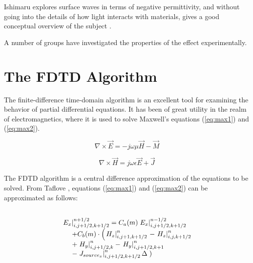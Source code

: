 \documentclass[11pt, conference, draftcls, letterpaper]{IEEEtran}
\begin{document}
Ishimaru explores surface waves in terms of negative permittivity,
and without going into the details of how light interacts with
materials, gives a good conceptual overview of the subject
\cite{ishimaru91}.  

A number of groups have investigated the properties of the effect
experimentally. 


\section{The FDTD Algorithm} 
The finite-difference time-domain algorithm \cite{yee1966} is an
excellent tool for examining the behavior of partial differential
equations. It has been of great utility in the realm of
electromagnetics, where it is used to solve Maxwell's equations
(\ref{eq:max1}) and (\ref{eq:max2}). 

\begin{equation}
  \label{eq:max1}
  \nabla \times \vec{E} = -j \omega \mu \vec{H} - \vec{M}
\end{equation}

\begin{equation}
  \label{eq:max2}
  \nabla \times \vec{H} = j \omega \epsilon \vec{E} + \vec{J}
\end{equation}

The FDTD algorithm is a central difference approximation of the
equations to be solved. From Taflove \cite{taflove????}, equations
(\ref{eq:max1}) and (\ref{eq:max2}) can be approximated as follows:

\begin{equation}
  \label{eq:approxEx}
  \begin{array}{ll}
    \hspace{0.15cm} & \\
    \multicolumn{2}{l}{\left.  E_x \right|^{n+1/2}_{i,j+1/2,k+1/2}
     = C_a(m) \left. E_x \right|^{n-1/2}_{i,j+1/2,k+1/2}} \\
    & + C_b(m) \cdot \left( \left. H_z \right|^{n}_{i,j+1,k+1/2} \right.
      - \left. H_z \right|^{n}_{i,j,k+1/2} \\
    & + \left. H_y \right|^{n}_{i,j+1/2,k} 
     - \left. H_y \right|^{n}_{i,j+1/2,k+1} \\
    & - \left. J_{source_x} \right|^{n}_{i,j+1/2,k+1/2} \Delta \left. \right) 
  \end{array}
\end{equation}
\end{document}
